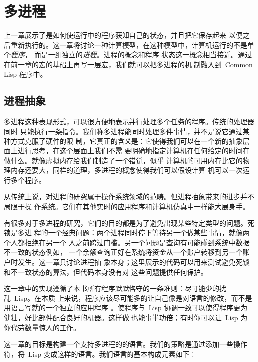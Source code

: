 
\chapter{多进程}
\label{chap:multiple_processes}

上一章展示了\continuation{}是如何使运行中的程序获知自己的状态，并且把它保存起来
以便之后重新执行的。这一章将讨论一种计算模型，在这种模型中，计算机运行的不是单个\emph{程序}，
而是一组独立的\emph{进程}。进程的概念和程序
状态这一概念相当接近。通过在前一章的宏的基础上再写一层宏，我们就可以把多进程的机
制融入到~Common Lisp 程序中。

\section{进程抽象}
\label{sec:the_process_abstraction}

多进程这种表现形式，可以很方便地表示并行处理多个任务的程序。传统的处理器同时
只能执行一条指令。我们称多进程能同时处理多件事情，并不是说它通过某种方式克服了硬件的限
制，它真正的含义是：它使得我们可以在一个新的抽象层面上进行思考，在这个层面上我们不需
要明确地指定计算机在任何给定的时间在做什么。就像虚拟内存给我们制造了一个错觉，似乎
计算机的可用内存比它的物理内存还要大，同样的道理，多进程的概念使得我们可以假设计算
机可以一次运行多个程序。

从传统上说，对进程的研究属于操作系统领域的范畴。但进程抽象带来的进步并不局限于操
作系统。它们在其他实时的应用程序和计算机仿真中一样能大展身手。

有很多对于多进程的研究，它们的目的都是为了避免出现某些特定类型的问题。死锁是多进
程的一个经典问题：两个进程同时停下等待另一个做某些事情，就像两个人都拒绝在另一个
人之前跨过门槛。另一个问题是查询有可能碰到系统中数据不一致的状态\pozhehao{}例如，
一个余额查询正好在系统将资金从一个账户转移到另一个账户时发生。这一章只讨论进程抽
象本身；这里展示的代码可以用来测试避免死锁和不一致状态的算法，但代码本身没有对
这些问题提供任何保护。

这一章中的实现遵循了本书所有程序默默恪守的一条准则：尽可能少的扰乱~Lisp。在本质
上来说，程序应该尽可能多的让自己像是对语言的修改，而不是用语言写就的一个独立的应用程序
。使程序与~Lisp 协调一致可以使得程序更为健壮，好比部件配合良好的机器。这样做
也能事半功倍；有时你可以让~Lisp 为你代劳数量惊人的工作。

这一章的目标是构建一个支持多进程的的语言。我们的策略是通过添加一些操作符，将~Lisp 
变成这样的语言。我们语言的基本构成元素如下：

